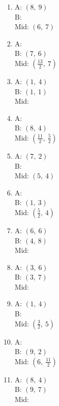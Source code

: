 \documentclass{article}
\begin{document}
\begin{enumerate}
\item A: $\left( 8, \  9\right)$\\B: \underline{\hspace{1cm}}\\Mid: $\left( 6, \  7\right)$\\ 
\item A: \underline{\hspace{1cm}}\\B: $\left( 7, \  6\right)$\\Mid: $\left( \frac{13}{2}, \  7\right)$\\ 
\item A: $\left( 1, \  4\right)$\\B: $\left( 1, \  1\right)$\\Mid: \underline{\hspace{1cm}}\\ 
\item A: \underline{\hspace{1cm}}\\B: $\left( 8, \  4\right)$\\Mid: $\left( \frac{11}{2}, \  \frac{5}{2}\right)$\\ 
\item A: $\left( 7, \  2\right)$\\B: \underline{\hspace{1cm}}\\Mid: $\left( 5, \  4\right)$\\ 
\item A: \underline{\hspace{1cm}}\\B: $\left( 1, \  3\right)$\\Mid: $\left( \frac{5}{2}, \  4\right)$\\ 
\item A: $\left( 6, \  6\right)$\\B: $\left( 4, \  8\right)$\\Mid: \underline{\hspace{1cm}}\\ 
\item A: $\left( 3, \  6\right)$\\B: $\left( 3, \  7\right)$\\Mid: \underline{\hspace{1cm}}\\ 
\item A: $\left( 1, \  4\right)$\\B: \underline{\hspace{1cm}}\\Mid: $\left( \frac{3}{2}, \  5\right)$\\ 
\item A: \underline{\hspace{1cm}}\\B: $\left( 9, \  2\right)$\\Mid: $\left( 6, \  \frac{11}{2}\right)$\\ 
\item A: $\left( 8, \  4\right)$\\B: $\left( 9, \  7\right)$\\Mid: \underline{\hspace{1cm}}\\ 



\end{enumerate}
\end{document}
